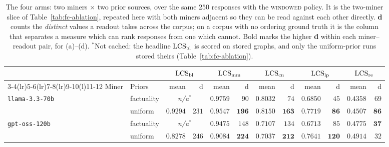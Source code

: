 \begin{table}[tbp]
\centering\small
\caption{The four arms: two miners $\times$ two prior sources, over the same $250$ responses with the
  \textsc{windowed} policy. It is the two-miner slice of Table~\ref{tab:fc-ablation}, repeated here
  with both miners adjacent so they can be read against each other directly. \textbf{d} counts the \emph{distinct} values a readout takes across the corpus; on a corpus
  with no ordering ground truth it is the column that separates a measure which can rank responses from
  one which cannot. Bold marks the higher \textbf{d} within each miner--readout pair, for (a)--(d).
  $^{*}$Not cached: the headline $\mathrm{LCS}_{\mathrm{bl}}$ is scored on stored graphs, and only the uniform-prior
  runs stored theirs (Table~\ref{tab:fc-ablation}).}
\label{tab:ablation}
\setlength{\tabcolsep}{3.5pt}
\begin{tabular}{@{}llrrrrrrrrrr@{}}
\toprule
& & \multicolumn{2}{c}{$\mathrm{LCS}_{\mathrm{bl}}$} & \multicolumn{2}{c}{$\mathrm{LCS}_{\mathrm{mm}}$} & \multicolumn{2}{c}{$\mathrm{LCS}_{\mathrm{cn}}$}
  & \multicolumn{2}{c}{$\mathrm{LCS}_{\mathrm{lp}}$} & \multicolumn{2}{c}{$\mathrm{LCS}_{\mathrm{re}}$} \\
\cmidrule(lr){3-4}\cmidrule(lr){5-6}\cmidrule(lr){7-8}\cmidrule(lr){9-10}\cmidrule(l){11-12}
Miner & Priors & mean & d & mean & d & mean & d & mean & d & mean & d \\
\midrule
\texttt{llama-3.3-70b} & factuality & \multicolumn{2}{c}{\textit{n/a}$^{*}$} & $0.9759$ & $90$ & $0.8032$ & $74$ & $0.6850$ & $45$
  & $0.4358$ & $69$ \\
                       & uniform    & $0.9294$ & $231$ & $0.9547$ & $\mathbf{196}$ & $0.8150$ & $\mathbf{163}$
  & $0.7719$ & $\mathbf{86}$ & $0.4507$ & $\mathbf{86}$ \\
\midrule
\texttt{gpt-oss-120b}  & factuality & \multicolumn{2}{c}{\textit{n/a}$^{*}$} & $0.9475$ & $148$ & $0.7107$ & $134$ & $0.6713$ & $85$
  & $0.4775$ & $\mathbf{37}$ \\
                       & uniform    & $0.8278$ & $246$ & $0.9084$ & $\mathbf{224}$ & $0.7037$ & $\mathbf{212}$
  & $0.7641$ & $\mathbf{120}$ & $0.4914$ & $32$ \\
\bottomrule
\end{tabular}
\end{table}

